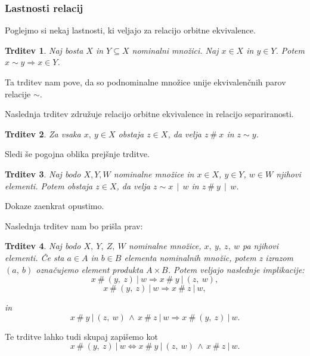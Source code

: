 \documentclass{article}
\newtheorem{trditev}{Trditev}
\begin{document}
\subsubsection{Lastnosti relacij}

Poglejmo si nekaj lastnosti, ki veljajo za relacijo orbitne ekvivalence.

\begin{trditev}
    Naj bosta \(X\) in \(Y \subseteq X\) nominalni množici. Naj \(x \in X\) in \(y \in Y\). Potem \(x \sim y \Rightarrow x \in Y\).
\end{trditev}

Ta trditev nam pove, da so podnominalne množice unije ekvivalenčnih parov relacije \(\sim\).





Naslednja trditev združuje relacijo orbitne ekvivalence in relacijo separiranosti.

\begin{trditev}
    Za vsaka \(x,\ y \in X\) obstaja \(z \in X\), da velja \(z \ \#\  x\) in \(z \sim y\).
\end{trditev}

Sledi še pogojna oblika prejšnje trditve.

\begin{trditev}
    \label{pogojna_trditev}
    Naj bodo \(X, Y, W\) nominalne množice in \(x \in X\), \(y \in Y\), \(w \in W\) njihovi elementi. Potem obstaja \(z \in X\), da velja \(z \sim x\ \ \vert\ \ w\) in \(z \ \#\  y\ \ \vert\ \ w\).
\end{trditev}


Dokaze zaenkrat opustimo.

Naslednja trditev nam bo prišla prav:
\begin{trditev}

    Naj bodo \(X,\ Y,\ Z,\ W\) nominalne množice, \(x,\ y,\ z,\ w\) pa njihovi elementi. Če sta \(a \in A\) in \(b \in B\) elementa nominalnih množic, potem z izrazom \((a,\ b)\) označujemo element produkta \(A \times B\). Potem veljajo naslednje implikacije:
    \begin{equation}
        \label{a1}
        x \ \#\  (y,\ z) \ \vert\ w \Longrightarrow x \ \#\  y \ \vert\ (z,\ w),
    \end{equation}
    \begin{equation}
        \label{a2}
        x \ \#\  (y,\ z) \ \vert\ w \Longrightarrow x \ \#\  z \ \vert\ w,
    \end{equation}

    in
    \begin{equation}
        \label{a3}
        x \ \#\  y \ \vert\ (z,\ w)\, \wedge\, x \ \#\ z \ \vert\ w \Longrightarrow x \ \#\ (y,\ z) \ \vert\ w.
    \end{equation}
\end{trditev}
Te trditve lahko tudi skupaj zapišemo kot
\[
    x \ \#\  (y,\ z) \ \vert\ w \Longleftrightarrow x \ \#\  y \ \vert\ (z,\ w)\, \wedge\, x \ \#\  z \ \vert\  w.
\]
\newpage
\end{document}
